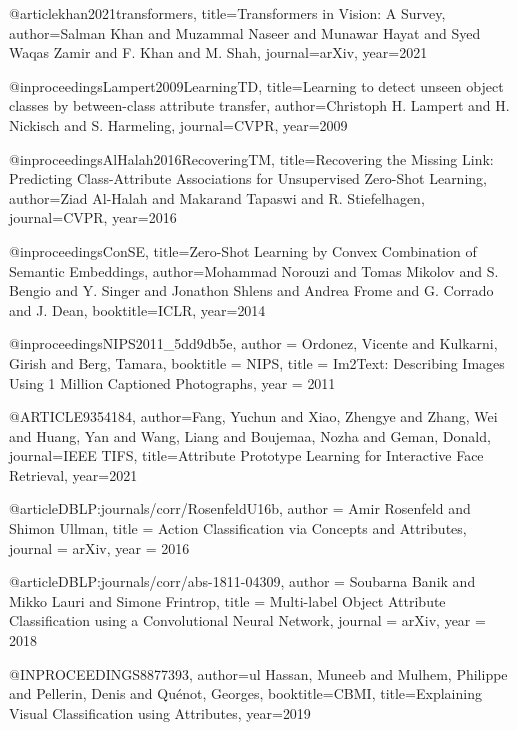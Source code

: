 @article{khan2021transformers,
  title={Transformers in Vision: A Survey},
  author={Salman Khan and Muzammal Naseer and Munawar Hayat and Syed Waqas Zamir and F. Khan and M. Shah},
  journal={arXiv},
  year={2021}
}


@inproceedings{Lampert2009LearningTD,
  title={Learning to detect unseen object classes by between-class attribute transfer},
  author={Christoph H. Lampert and H. Nickisch and S. Harmeling},
  journal={CVPR},
  year={2009}
}


@inproceedings{AlHalah2016RecoveringTM,
  title={Recovering the Missing Link: Predicting Class-Attribute Associations for Unsupervised Zero-Shot Learning},
  author={Ziad Al-Halah and Makarand Tapaswi and R. Stiefelhagen},
  journal={CVPR},
  year={2016}}


@inproceedings{ConSE,
  title={Zero-Shot Learning by Convex Combination of Semantic Embeddings},
  author={Mohammad Norouzi and Tomas Mikolov and S. Bengio and Y. Singer and Jonathon Shlens and Andrea Frome and G. Corrado and J. Dean},
  booktitle={ICLR},
  year={2014}
}


@inproceedings{NIPS2011_5dd9db5e,
 author = {Ordonez, Vicente and Kulkarni, Girish and Berg, Tamara},
 booktitle = {NIPS},
 title = {Im2Text: Describing Images Using 1 Million Captioned Photographs},
 year = {2011}
}




@ARTICLE{9354184,  author={Fang, Yuchun and Xiao, Zhengye and Zhang, Wei and Huang, Yan and Wang, Liang and Boujemaa, Nozha and Geman, Donald},  journal={IEEE TIFS},   title={Attribute Prototype Learning for Interactive Face Retrieval},   year={2021}}


@article{DBLP:journals/corr/RosenfeldU16b,
  author    = {Amir Rosenfeld and
               Shimon Ullman},
  title     = {Action Classification via Concepts and Attributes},
  journal   = {arXiv},
  year      = {2016}
}


@article{DBLP:journals/corr/abs-1811-04309,
  author    = {Soubarna Banik and
               Mikko Lauri and
               Simone Frintrop},
  title     = {Multi-label Object Attribute Classification using a Convolutional
               Neural Network},
  journal   = {arXiv},
  year      = {2018}
}

@INPROCEEDINGS{8877393,  author={ul Hassan, Muneeb and Mulhem, Philippe and Pellerin, Denis and Quénot, Georges},  booktitle={CBMI},   title={Explaining Visual Classification using Attributes},   year={2019}}




